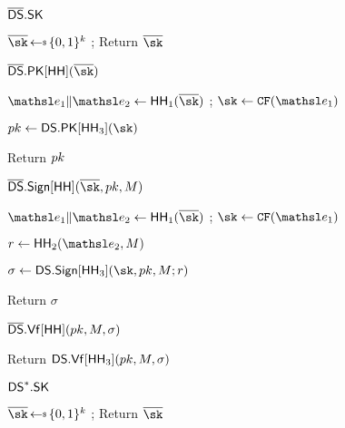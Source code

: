 %
%
%


\begin{figure}[t]
{
  \begin{algorithm-initial}{$\overline{\mathsf{DS}}.\mathsf{SK}$}
  \item $\osk\getsr\bits^k$ 
  ; Return $\osk$
  \end{algorithm-initial}

\begin{algorithm-subsequent}{$\fDS.\MakePK[\HH](\osk)$}
  \item $\eEDSA_1\|\eEDSA_2\gets\HH_1(\osk)$ 
  ; $\sk \gets \CFEDSA(\eEDSA_1)$ 
  \item $\pk \gets \DS.\MakePK[\HH_3](\sk)$ 
  \item Return $pk$
  \end{algorithm-subsequent}
  
  \begin{algorithm-subsequent}{$\fDS.\Sign[\HH](\osk, \pk, \msg)$}
\item $\eEDSA_1\|\eEDSA_2\gets\HH_1(\osk)$ 
  ; $\sk \gets \CFEDSA(\eEDSA_1)$ 
  \item $r \gets \HH_2(\eEDSA_2,\msg)$  
\item $\sigma \gets \DS.\Sign[\HH_3](\sk,\pk,\msg;r)$ 
\item  Return $\sigma$
  \end{algorithm-subsequent}

  \begin{algorithm-subsequent}{$\overline{\mathsf{DS}}.\mathsf{Vf}[\mathsf{HH}](pk, {M}, \sigma)$}
    \item Return $\mathsf{DS}.\mathsf{Vf}[\mathsf{HH}_3](pk,{M},\sigma)$
  \end{algorithm-subsequent}  \vspace{2pt}
 }
 {
  \begin{algorithm-initial}{$\mathsf{DS}^*.\mathsf{SK}$}
  \item $\osk\getsr\bits^k$ 
  ; Return $\osk$
  \end{algorithm-initial}

}
\end{figure}
